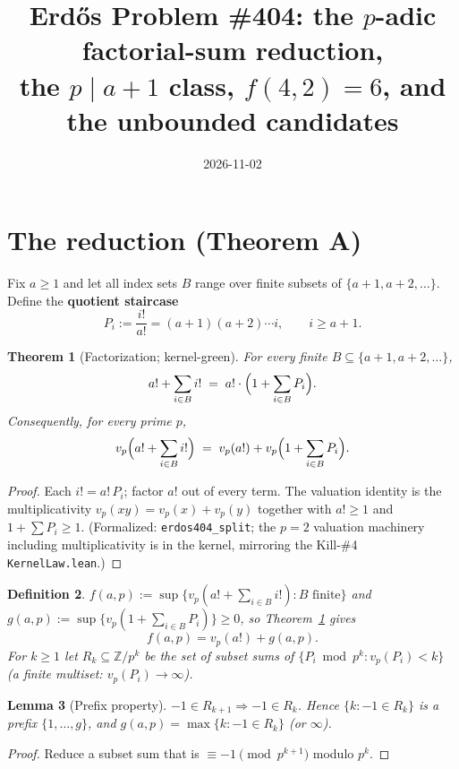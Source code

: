 \documentclass{article}
\newtheorem{theorem}{Theorem}
\newtheorem{lemma}[theorem]{Lemma}
\newtheorem{definition}[theorem]{Definition}
\newcommand{\vpp}{v_p}
\begin{document}
\title{Erd\H{o}s Problem \#404: the $p$-adic factorial-sum reduction,\\
the $p \mid a{+}1$ class, $f(4,2)=6$, and the unbounded candidates}
\date{2026-11-02}
\maketitle

\section{The reduction (Theorem A)}

Fix $a \ge 1$ and let all index sets $B$ range over finite subsets of
$\{a+1, a+2, \ldots\}$.  Define the \textbf{quotient staircase}
\[
  P_i := \frac{i!}{a!} = (a+1)(a+2)\cdots i, \qquad i \ge a+1 .
\]

\begin{theorem}[Factorization; kernel-green]\label{thm:A}
For every finite $B \subseteq \{a{+}1, a{+}2,\ldots\}$,
\[ a! + \sum_{i\in B} i! \;=\; a! \cdot \Bigl(1 + \sum_{i \in B} P_i\Bigr). \]
Consequently, for every prime $p$,
\[ \vpp\Bigl(a! + \sum_{i\in B} i!\Bigr) \;=\; \vpp(a!) + \vpp\Bigl(1+\sum_{i\in B}P_i\Bigr). \]
\end{theorem}
\begin{proof}
Each $i! = a!\,P_i$; factor $a!$ out of every term.  The valuation identity
is the multiplicativity $\vpp(xy) = \vpp(x)+\vpp(y)$ together with $a! \ge 1$
and $1 + \sum P_i \ge 1$.  (Formalized: \texttt{erdos404\_split}; the $p=2$
valuation machinery including multiplicativity is in the kernel, mirroring
the Kill-\#4 \texttt{KernelLaw.lean}.)
\end{proof}

\begin{definition}
$f(a,p) := \sup \bigl\{ \vpp(a! + \sum_{i\in B} i!) : B \text{ finite} \bigr\}$
and $g(a,p) := \sup \bigl\{ \vpp(1 + \sum_{i\in B}P_i) \bigr\} \ge 0$,
so Theorem~\ref{thm:A} gives
\[ f(a,p) = \vpp(a!) + g(a,p). \]
For $k \ge 1$ let $R_k \subseteq \mathbb{Z}/p^k$ be the set of subset sums of
$\{P_i \bmod p^k : \vpp(P_i) < k\}$ (a \emph{finite} multiset: $\vpp(P_i) \to \infty$).
\end{definition}

\begin{lemma}[Prefix property]\label{lem:prefix}
$-1 \in R_{k+1} \Rightarrow -1 \in R_k$.  Hence $\{k : -1 \in R_k\}$ is a
prefix $\{1,\ldots,g\}$, and $g(a,p) = \max\{k : -1 \in R_k\}$ (or $\infty$).
\end{lemma}
\begin{proof}
Reduce a subset sum that is $\equiv -1 \pmod{p^{k+1}}$ modulo $p^k$.
\end{proof}
\end{document}
